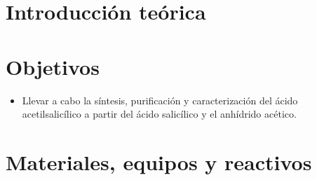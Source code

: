 
\section{Introducción teórica}



\section{Objetivos}

\begin{itemize}
    \item Llevar a cabo la síntesis, purificación y caracterización del ácido acetilsalicílico a partir del ácido salicílico y el anhídrido acético.
\end{itemize}

\section{Materiales, equipos y reactivos}

